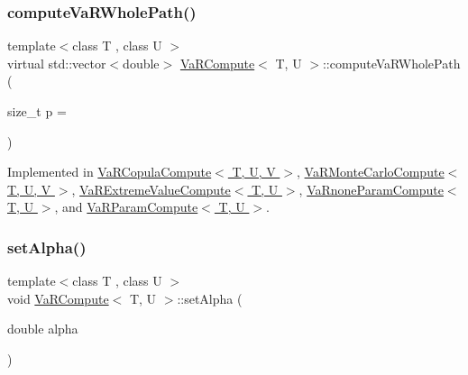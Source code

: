 \hypertarget{classVaRCompute_ad5ec9feb42ea2f99f2c91e793d18fe1b}{}\label{classVaRCompute_ad5ec9feb42ea2f99f2c91e793d18fe1b} 
\subsubsection{\texorpdfstring{compute\+Va\+R\+Whole\+Path()}{computeVaRWholePath()}}
{\footnotesize\ttfamily template$<$class T , class U $>$ \\
virtual std\+::vector$<$double$>$ \hyperlink{classVaRCompute}{Va\+R\+Compute}$<$ T, U $>$\+::compute\+Va\+R\+Whole\+Path (\begin{DoxyParamCaption}\item[{size\+\_\+t}]{p = {} }\end{DoxyParamCaption})\hspace{0.3cm}{\ttfamily [pure virtual]}}



Implemented in \hyperlink{classVaRCopulaCompute_a6c2501fcfd848a07a91859f2bcdc6516}{Va\+R\+Copula\+Compute$<$ T, U, V $>$}, \hyperlink{classVaRMonteCarloCompute_a14ea83586172f23f8bb4a60babeb812f}{Va\+R\+Monte\+Carlo\+Compute$<$ T, U, V $>$}, \hyperlink{classVaRExtremeValueCompute_ad3b7ec9abcd6f6b27c89cf77e0099d18}{Va\+R\+Extreme\+Value\+Compute$<$ T, U $>$}, \hyperlink{classVaRnoneParamCompute_a7ddfb62c4e1e9890542818c75c51798e}{Va\+Rnone\+Param\+Compute$<$ T, U $>$}, and \hyperlink{classVaRParamCompute_abc97057d7e35d8dc98fb3a560be67d0d}{Va\+R\+Param\+Compute$<$ T, U $>$}.

\hypertarget{classVaRCompute_a9a58944ea61c92f90befb024d12fe80c}{}\label{classVaRCompute_a9a58944ea61c92f90befb024d12fe80c} 
\subsubsection{\texorpdfstring{set\+Alpha()}{setAlpha()}}
{\footnotesize\ttfamily template$<$class T , class U $>$ \\
void \hyperlink{classVaRCompute}{Va\+R\+Compute}$<$ T, U $>$\+::set\+Alpha (\begin{DoxyParamCaption}\item[{double}]{alpha }\end{DoxyParamCaption})\hspace{0.3cm}{\ttfamily [inline]}}

